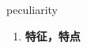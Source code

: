 
\begin{frame}
{\huge peculiarity}
\begin{center}
\begin{enumerate}\Large
  \item \textbf{特征，特点}
\end{enumerate}
\end{center}
\end{frame}
